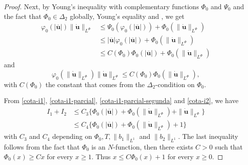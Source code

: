 \documentclass[twoside]{article}
\theoremstyle{remark}
\newcommand{\orlnor}{\|_{L^{\Phi}}}
\renewcommand{\b}[1]{\boldsymbol{#1}}
\renewcommand{\leq}{\leqslant}
\renewcommand{\geq}{\geqslant}
\begin{document}
\begin{proof}
Next, by Young's inequality with complementary functions $\Phi_0$ and $\Psi_0$ and the fact that 
$\Phi_0 \in \Delta_2$ globally, Young's equality \cite[Eq. 2.7-2.8]{KR} and \cite[Th. 3-(ii), p. 23]{rao1991theory}, we get
\begin{equation}\label{cota-i1-parcial}
 \begin{split}
\varphi_0(|\b{\overline{u}}|) \|\b{\dot{u}}\orlnor
&\leq 
\Psi_0(\varphi_0(|\b{\overline{u}}|))+
\Phi_0(\|\b{\dot{u}}\orlnor)
\\
&\leq 
|\b{\overline{u}}|\varphi_0(|\b{\overline{u}}|)
+\Phi_0(\|\b{\dot{u}}\orlnor)
\\
&\leq C(\Phi_0)
\Phi_0(|\b{\overline{u}}|)
+\Phi_0(\|\b{\dot{u}}\orlnor)
\end{split}
\end{equation}
and 
\begin{equation}\label{cota-i1-parcial-segunda}
\varphi_0(\|\b{\dot u}\orlnor) \|\b{\dot u}\orlnor
\leq 
C(\Phi_0) \Phi_0(\|\b{\dot u}\orlnor),
\end{equation}
with $C(\Phi_0)$ the constant that comes from the $\Delta_2$-condition on $\Phi_0$.

From \eqref{cota-i1}, \eqref{cota-i1-parcial}, \eqref{cota-i1-parcial-segunda} and \eqref{cota-i2},
we have
\begin{equation}\label{cota-i1-i2}
\begin{split}
I_1+I_2
&
\leq C_3
\bigg\{ 
\Phi_0(|\b{\overline{u}}|)
+\Phi_0(\|\b{\dot{u}}\orlnor)
+\|\b{\dot{u}}\orlnor
\bigg\}\\
&
\leq C_4
\bigg\{ 
\Phi_0(|\b{\overline{u}}|)
+\Phi_0(\|\b{\dot{u}}\orlnor)
+1
\bigg\}
\end{split}
\end{equation}
with $C_3$ and $C_4$ depending on $\Phi_0,T, \|b_1\|_{L^1}$ and $\|b_2\|_{L^1} $. The last inequality follows from the fact that $\Phi_0$ is an $N$-function, then there exists $C>0$ such that $\Phi_0(x)\geq Cx$ for every $x\geq 1$. Thus $x\leq C\Phi_0(x)+1$ for every $x\geq 0$.



\end{proof}
\end{document}
